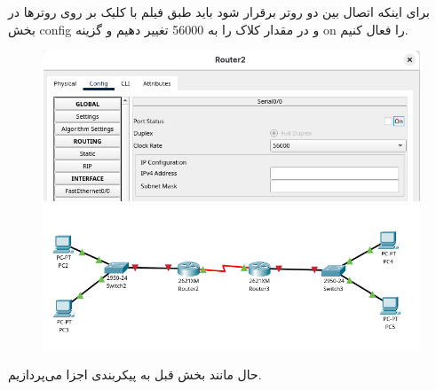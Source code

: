 برای اینکه اتصال بین دو روتر برقرار شود باید طبق فیلم با کلیک بر روی روترها در بخش config و در  مقدار کلاک را به 56000 تغییر دهیم و گزینه on را فعال کنیم.
\begin{figure}[h]
    \centering
    \includegraphics[width=1\textwidth]{img/14.png}
    \includegraphics[width=1\textwidth]{img/13.png}
\end{figure}
\clearpage
حال مانند بخش قبل به پیکربندی اجزا می‌پردازیم.

